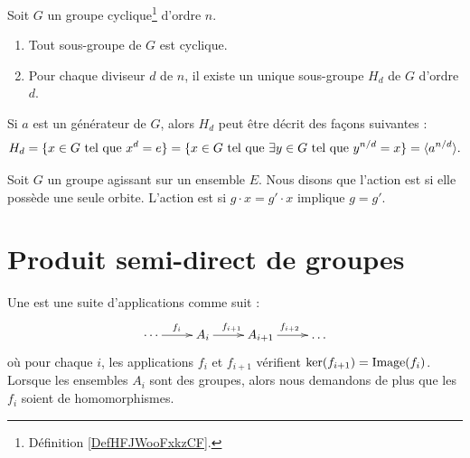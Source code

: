 \begin{theorem}     \label{THOooRGSTooIWyhqt}
    Soit \( G\) un groupe cyclique\footnote{Définition \ref{DefHFJWooFxkzCF}.} d'ordre \( n\).
    \begin{enumerate}
        \item
            Tout sous-groupe de \( G\) est cyclique.
        \item
            Pour chaque diviseur \( d\) de \( n\), il existe un unique sous-groupe \( H_d\) de \( G\) d'ordre \( d\).
    \end{enumerate}
    Si \( a\) est un générateur de \( G\), alors \( H_d\) peut être décrit des façons suivantes :
    \begin{equation}
        H_d=\{ x\in G\text{ tel que } x^d=e \}=\{ x\in G\text{ tel que }\exists y\in G\text{ tel que } y^{n/d}=x \}=\langle a^{n/d}\rangle.
    \end{equation}
\end{theorem}


\begin{definition}      \label{DEFooQDHPooCfDEuL}
    Soit \( G\) un groupe agissant sur un ensemble \( E\). Nous disons que l'action est  si elle possède une seule orbite. L'action est  si \( g\cdot x=g'\cdot x\) implique \( g=g'\).
\end{definition}

\section{Produit semi-direct de groupes}

\begin{definition}
    Une  est une suite d'applications comme suit :
    \begin{equation}
        \xymatrix{%
        \cdots \ar[r]^{f_i}&A_i\ar[r]^{f_{i+1}}& A_{i+1}\ar[r]^{f_{i+2}}&\ldots
           }
    \end{equation}
    où pour chaque \( i\), les applications \( f_i\) et \( f_{i+1}\) vérifient \( \ker(f_{i+1})=\operatorname{Image}(f_i)\). Lorsque les ensembles \( A_i\) sont des groupes, alors nous demandons de plus que les \( f_i\) soient de homomorphismes.
\end{definition}

